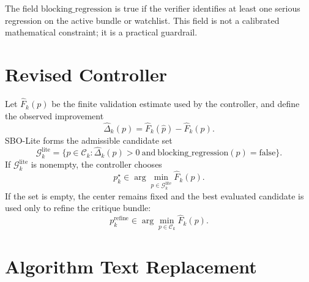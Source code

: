 \documentclass{article}
\begin{document}
The field \(\mathrm{blocking\_regression}\) is true if the verifier identifies
at least one serious regression on the active bundle or watchlist. This field is
not a calibrated mathematical constraint; it is a practical guardrail.

\section{Revised Controller}

Let \(\widehat F_k(p)\) be the finite validation estimate used by the
controller, and define the observed improvement
\[
    \widehat\Delta_k(p)
    =
    \widehat F_k(\hat p)-\widehat F_k(p).
\]
SBO-Lite forms the admissible candidate set
\[
    \mathcal G_k^{\mathrm{lite}}
    =
    \{p\in\mathcal C_k:
      \widehat\Delta_k(p)>0
      \ \mathrm{and}\
      \mathrm{blocking\_regression}(p)=\mathrm{false}\}.
\]
If \(\mathcal G_k^{\mathrm{lite}}\) is nonempty, the controller chooses
\[
    p_k^{\star}\in
    \arg\min_{p\in\mathcal G_k^{\mathrm{lite}}}\widehat F_k(p).
\]
If the set is empty, the center remains fixed and the best evaluated candidate
is used only to refine the critique bundle:
\[
    p_k^{\mathrm{refine}}\in
    \arg\min_{p\in\mathcal C_k}\widehat F_k(p).
\]

\section{Algorithm Text Replacement}
\end{document}

